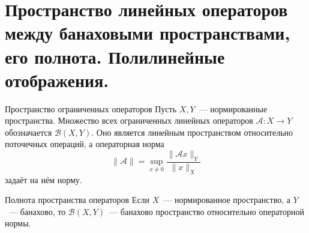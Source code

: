 
\section{Пространство линейных операторов между банаховыми пространствами, его полнота. Полилинейные отображения.}

\begin{Definition}{Пространство ограниченных операторов}{}
	Пусть $X, Y$~--- нормированные пространства. Множество всех ограниченных линейных операторов $\mathcal{A}\colon X \to Y$ обозначается $\mathcal{B}(X, Y)$. Оно является линейным пространством относительно поточечных операций, а операторная норма
	\[
	\|\mathcal{A}\| = \sup_{x \neq 0} \frac{\|\mathcal{A}x\|_Y}{\|x\|_X}
	\]
	задаёт на нём норму.
\end{Definition}

\begin{Theorem}{Полнота пространства операторов}{}
	Если $X$~--- нормированное пространство, а $Y$~--- банахово, то $\mathcal{B}(X, Y)$~--- банахово пространство относительно операторной нормы.
\end{Theorem}

